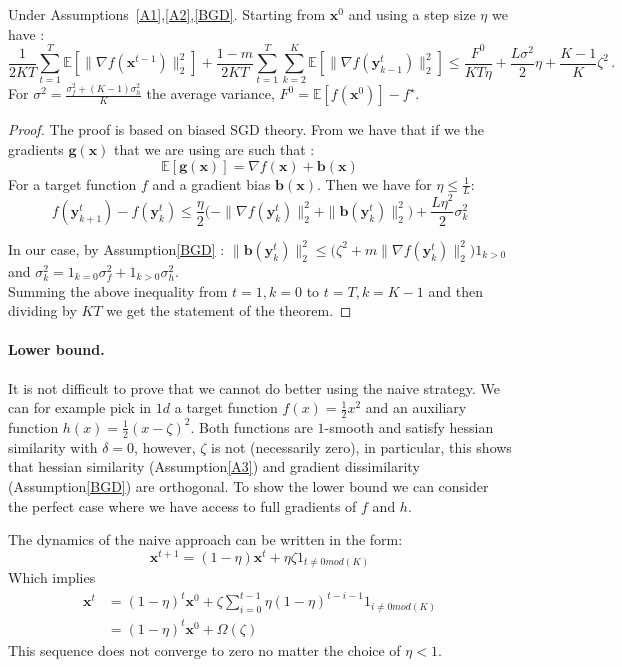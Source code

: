 \documentclass[10pt]{article} %
\theoremstyle{plain}
\theoremstyle{definition}
\theoremstyle{remark}
\newcommand{\norm}[1]{\|#1\|_2}
\def\vb{{\bm{b}}}
\def\vg{{\bm{g}}}
\def\vx{{\bm{x}}}
\def\vy{{\bm{y}}}
\newcommand{\E}{\mathbb{E}}
\begin{document}
\begin{framedtheorem}
Under Assumptions~\ref{A1},\ref{A2},\ref{BGD}. Starting from $\vx^0$ and using a step size $\eta$ we have :
$$\frac{1}{2KT}\sum_{t=1}^T\E[\norm{\nabla f(\vx^{t-1})}^2] + \frac{1 - m}{2KT}\sum_{t=1}^T\sum_{k=2}^K\E[\norm{\nabla f(\vy^{t}_{k-1})}^2] \leq \frac{F^0}{KT\eta} + \frac{L\sigma^2}{2}\eta + \frac{K-1}{K}\zeta^2\, .$$
For $\sigma^2 = \frac{\sigma_f^2 + (K - 1)\sigma_h^2 }{K}$ the average variance, $F^0 = \E[f(\vx^0)] - f^\star$.
\end{framedtheorem}

\begin{proof}
The proof is based on biased SGD theory. From \citep{BiasedSGD} we have that if we the gradients $\vg(\vx)$ that we are using are such that :
$$\E[\vg(\vx)] = \nabla f(\vx) + \vb(\vx)$$
For a target function $f$ and a gradient bias $\vb(\vx)$. Then we have for $\eta\leq \frac{1}{L}$:
$$f(\vy^{t}_{k+1}) - f(\vy^{t}_{k}) \leq \frac{\eta}{2}\big(-\norm{\nabla f(\vy^{t}_{k})}^2 + \norm{\vb(\vy^{t}_{k})}^2 \big) + \frac{L\eta^2}{2}\sigma_k^2$$

In our case, by Assumption\ref{BGD} : $\norm{\vb(\vy^{t}_{k})}^2\leq \big(\zeta^2 + m\norm{\nabla f(\vy^{t}_{k})}^2\big) 1_{k>0}$ and $\sigma_k^2 = 1_{k=0}\sigma_f^2 + 1_{k>0} \sigma_h^2$.\\
Summing the above inequality from $t=1,k=0$ to $t=T,k=K-1$ and then dividing by $KT$ we get the statement of the theorem.
\end{proof}
\paragraph{Lower bound.} It is not difficult to prove that we cannot do better using the naive strategy. We can for example pick in $1d$  a target function $f(x) = \frac{1}{2}x^2$ and an auxiliary function $h(x)= \frac{1}{2}(x - \zeta)^2$. Both functions are $1$-smooth and satisfy hessian similarity with $\delta=0$, however, $\zeta$ is not (necessarily zero), in particular, this shows that hessian similarity (Assumption\ref{A3}) and gradient dissimilarity (Assumption\ref{BGD}) are orthogonal. To show the lower bound we can consider the perfect case where we have access to full gradients of $f$ and $h$.

The dynamics of the naive approach can be written in the form:$$\vx^{t+1} = (1 - \eta)\vx^t + \eta \zeta 1_{t\neq 0 mod(K)}$$
Which implies 
\begin{align*}
    \vx^{t} &= (1 - \eta)^t\vx^0 +  \zeta \sum_{i=0}^{t-1}\eta(1-\eta)^{t-i-1}1_{i\neq 0 mod(K)}\\
    &=(1 - \eta)^t\vx^0 +  \Omega(\zeta)
\end{align*}
This sequence does not converge to zero no matter the choice of $\eta<1$.
\end{document}
